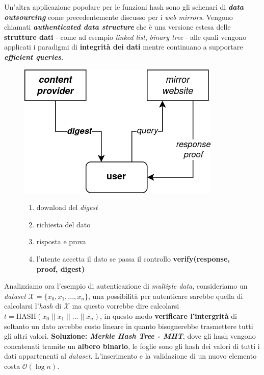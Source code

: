 \begin{flushleft}
    Un'altra applicazione popolare per le funzioni hash sono gli schenari di \textbf{\textit{data outsourcing}} come precedentemente discusso per i \textit{web mirrors}. Vengono chiamati \textbf{\textit{authenticated data structure}} che è una versione estesa delle \textbf{strutture dati} - come ad esempio \textit{linked list}, \textit{binary tree} - alle quali vengono applicati i paradigmi di \textbf{integrità dei dati} mentre continuano a supportare \textbf{\textit{efficient queries}}.

    \begin{figure}[h]
        \centering
        \begin{minipage}[c]{0.45\textwidth}
            \centering
            \includegraphics[width=\textwidth]{img/ads.png}
        \end{minipage}
        \hfill
        \begin{minipage}[c]{0.45\textwidth}
            \begin{enumerate}[nosep]
                \item download del \textit{digest}
                \item richiesta del dato
                \item risposta e prova
                \item l'utente accetta il dato se passa il controllo \textbf{verify(response, proof, digest)}
            \end{enumerate}
        \end{minipage}
    \end{figure}

    Analizziamo ora l'esempio di autenticazione di \textit{multiple data}, consideriamo un \textit{dataset} $\mathcal{X} = \{x_0, x_1, ..., x_n\}$, una possibilità per autenticare sarebbe quella di calcolarsi l'\textit{hash} di $\mathcal{X}$ ma questo vorrebbe dire calcolarsi $t = \text{HASH}(x_0 \; || \; x_1 \; || \; ... \; || \; x_n)$, in questo modo \textbf{verificare l'intergrità} di soltanto un dato avrebbe costo lineare in quanto bisognerebbe trasmettere tutti gli altri valori. \textbf{Soluzione: \textit{Merkle Hash Tree - MHT}}, dove gli hash vengono concatenati tramite un \textbf{albero binario}, le foglie sono gli hash dei valori di tutti i dati appartenenti al \textit{dataset}. L'inserimento e la validazione di un nuovo elemento costa $\mathcal{O}(\log n)$.


\end{flushleft}
